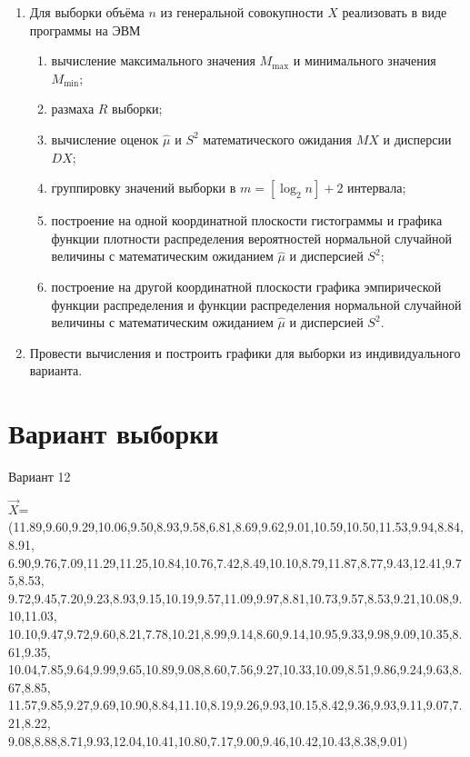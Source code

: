 \documentclass[12pt]{report}
\begin{document}
\begin{enumerate}
	\item Для выборки объёма $n$ из генеральной совокупности $X$ реализовать в виде программы на ЭВМ
	\begin{enumerate}
		\item вычисление максимального значения $M_{\max}$ и минимального значения $M_{\min}$;
		\item размаха $R$ выборки;
		\item вычисление оценок $\hat\mu$ и $S^2$ математического ожидания $MX$ и дисперсии $DX$;
		\item группировку значений выборки в $m = [\log_2 n] + 2$ интервала;
		\item построение на одной координатной плоскости гистограммы и графика функции плотности распределения вероятностей нормальной случайной величины с математическим ожиданием $\hat{\mu}$ и дисперсией $S^2$;
		\item построение на другой координатной плоскости графика эмпирической функции распределения и функции распределения нормальной случайной величины с математическим ожиданием $\hat{\mu}$ и дисперсией $S^2$.
	\end{enumerate}
	\item Провести вычисления и построить графики для выборки из индивидуального варианта.
\end{enumerate}

\section*{Вариант выборки}
Вариант 12

$\vec{X}$=(11.89,9.60,9.29,10.06,9.50,8.93,9.58,6.81,8.69,9.62,9.01,10.59,10.50,11.53,9.94,8.84,8.91,\\6.90,9.76,7.09,11.29,11.25,10.84,10.76,7.42,8.49,10.10,8.79,11.87,8.77,9.43,12.41,9.75,8.53,\\9.72,9.45,7.20,9.23,8.93,9.15,10.19,9.57,11.09,9.97,8.81,10.73,9.57,8.53,9.21,10.08,9.10,11.03,\\10.10,9.47,9.72,9.60,8.21,7.78,10.21,8.99,9.14,8.60,9.14,10.95,9.33,9.98,9.09,10.35,8.61,9.35,\\10.04,7.85,9.64,9.99,9.65,10.89,9.08,8.60,7.56,9.27,10.33,10.09,8.51,9.86,9.24,9.63,8.67,8.85,\\11.57,9.85,9.27,9.69,10.90,8.84,11.10,8.19,9.26,9.93,10.15,8.42,9.36,9.93,9.11,9.07,7.21,8.22,\\9.08,8.88,8.71,9.93,12.04,10.41,10.80,7.17,9.00,9.46,10.42,10.43,8.38,9.01)
\end{document}
